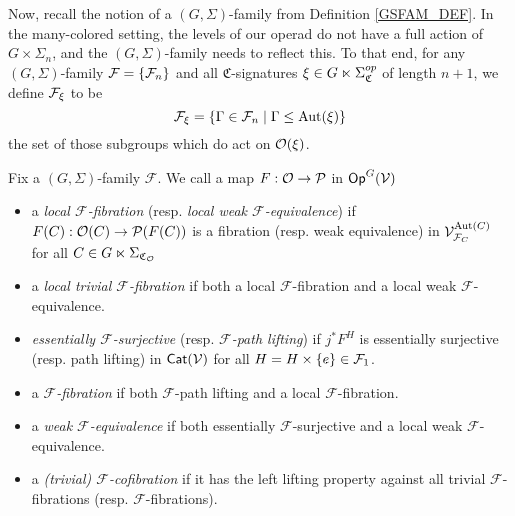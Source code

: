 \documentclass[a4paper,10pt
,draft
]{article}%
\renewcommand{\F}{\mathcal F}
\renewcommand{\1}{\eta}%
\newcommand{\SC}{\Sigma_{\mathfrak C}}
\begin{document}
Now, recall the notion of a $(G, \Sigma)$-family from Definition \ref{GSFAM_DEF}.
In the many-colored setting, the levels of our operad do not have a full action of $G \times \Sigma_n$, and the $(G, \Sigma)$-family needs to reflect this.
To that end, for any $(G, \Sigma)$-family $\F = \set{\F_n}$ and all $\mathfrak C$-signatures $\ksi \in G \ltimes \SC^{op}$ of length $n+1$, we define
$\F_\ksi$ to be
\[
      \F_\ksi = \sets{\Gamma \in \F_n}{\Gamma \leq \Aut(\ksi)}
\]
the set of those subgroups which do act on $\mathcal{O}(\xi)$.


\begin{definition}
      \label{MODEL_DEFN}
      Fix a $(G, \Sigma)$-family $\F$.
      We call a map $F: \mathcal{O} \to \mathcal{P}$ in $\mathsf{Op}^G(\mathcal V)$
      \begin{itemize}
      \item a {\em local $\F$-fibration} (resp. {\em local weak $\F$-equivalence}) if
            $F(C): \mathcal{O}(C)\to \mathcal{P}(F(C))$
            is a fibration (resp. weak equivalence) in $\V^{\Aut(C)}_{\F_C}$ for all $C \in G \ltimes \Sigma_{\mathfrak C_{\mathcal{O}}}$
      \item a {\em local trivial $\F$-fibration} if both a local $\F$-fibration and a local weak $\F$-equivalence.
      \item {\em essentially $\F$-surjective} (resp. {\em $\F$-path lifting}) if $j^*F^H$ is essentially surjective (resp. path lifting) in $\mathsf{Cat}(\mathcal V)$ for all $H = H \times \set{e} \in \F_1$.
      \item a {\em $\F$-fibration} if both $\F$-path lifting and a local $\F$-fibration.
      \item a {\em weak $\F$-equivalence} if both essentially $\F$-surjective and a local weak $\F$-equivalence.
      \item a \textit{(trivial) $\F$-cofibration} if it has the left lifting property against all trivial $\F$-fibrations (resp. $\F$-fibrations).
      \end{itemize}
\end{definition}
\end{document}
